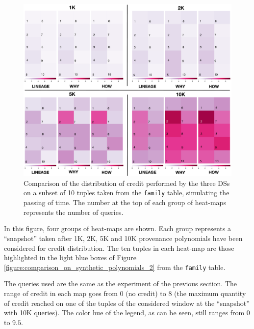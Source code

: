 \begin{figure}[t]
  \includegraphics[width=\textwidth]{figures/experiments/comparison}
  \caption{Comparison of the distribution of credit performed by the three DSs on a subset of 10 tuples taken from the \texttt{family} table, simulating the passing of time. The number at the top of each group of heat-maps represents the number of queries.}
  \label{fig:comparison}
\end{figure}

In this figure, four groups of heat-maps are shown. Each group represents a ``snapshot'' taken %
after 1K, 2K, 5K and 10K provenance polynomials have been considered for credit distribution.  
The ten tuples in each heat-map  %
are those  highlighted in the light blue boxes of Figure \ref{figure:comparison_on_synthetic_polynomials_2} from the \texttt{family} table.  


The queries used are the same as the experiment of the previous section. The range of credit in each map goes from 0 (no credit) to 8 (the maximum quantity of credit reached on one of the tuples of the considered window at the ``snapshot'' with 10K queries). The color hue of the legend, as can be seen, still ranges from $0$ to $9.5$.



